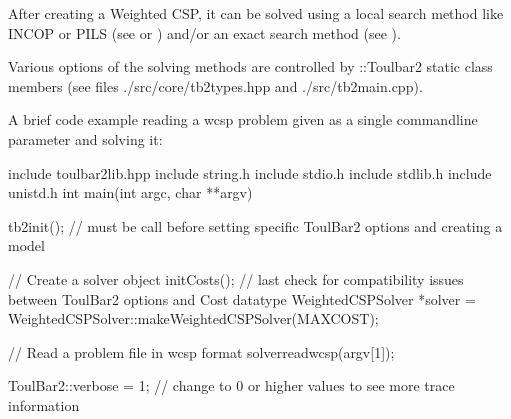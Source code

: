 \documentclass[letterpaper,10pt,openany,oneside,english]{sphinxmanual}
\begin{document}
\begin{fulllineitems}

\pysigstartsignatures
{}
\pysigstopsignatures
\sphinxAtStartPar
After creating a Weighted CSP, it can be solved using a local search method like INCOP or PILS (see {\hyperref[\detokenize{ref/ref_cpp:classWeightedCSPSolver_1af481cf37ff94238ab1e15bff34026209}]{}} or {\hyperref[\detokenize{ref/ref_cpp:classWeightedCSPSolver_1a94898d20bff27abdb156ed2e248a8004}]{}}) and/or an exact search method (see {\hyperref[\detokenize{ref/ref_cpp:classWeightedCSPSolver_1ab1f9d2c018bf050a6b010680a2008171}]{}}).

\sphinxAtStartPar

\sphinxAtStartPar
Various options of the solving methods are controlled by ::Toulbar2 static class members (see files ./src/core/tb2types.hpp and ./src/tb2main.cpp).

\sphinxAtStartPar
A brief code example reading a wcsp problem given as a single command\sphinxhyphen{}line parameter and solving it:

\begin{sphinxVerbatim}[commandchars=\\\{\}]
\PYGZsh{}include \PYGZdq{}toulbar2lib.hpp\PYGZdq{}
\PYGZsh{}include \PYGZlt{}string.h\PYGZgt{}
\PYGZsh{}include \PYGZlt{}stdio.h\PYGZgt{}
\PYGZsh{}include \PYGZlt{}stdlib.h\PYGZgt{}
\PYGZsh{}include \PYGZlt{}unistd.h\PYGZgt{}
int main(int argc, char **argv) \PYGZob{}

    tb2init(); // must be call before setting specific ToulBar2 options and creating a model

    // Create a solver object
    initCosts(); // last check for compatibility issues between ToulBar2 options and Cost data\PYGZhy{}type
    WeightedCSPSolver *solver = WeightedCSPSolver::makeWeightedCSPSolver(MAX\PYGZus{}COST);

    // Read a problem file in wcsp format
    solver\PYGZhy{}\PYGZgt{}read\PYGZus{}wcsp(argv[1]);

    ToulBar2::verbose = \PYGZhy{}1;  // change to 0 or higher values to see more trace information


\end{sphinxVerbatim}
\end{fulllineitems}
\end{document}

